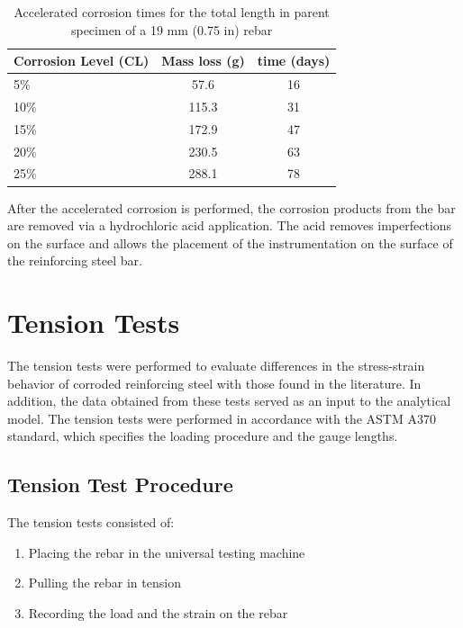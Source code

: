 \begin{table}[htbp]
	\caption{Accelerated corrosion times for the total length in parent specimen of a 19 mm (0.75 in) rebar}
	\label{tab:AcceleratedCorrosionTime}
	\centering	
		\begin{tabular}{l c c}
		Corrosion Level (CL) & Mass loss (g)   & time (days)     \\  \hline	
		5\%                  & 57.6            & 16    \\	
		10\%                 & 115.3            & 31     \\	
		15\%                 & 172.9            & 47   \\	
		20\%                 & 230.5            & 63     \\
		25\%                 & 288.1               & 78   \\
		\end{tabular}
\end{table}

After the accelerated corrosion is performed, the corrosion products from the bar are removed via a hydrochloric acid application. The acid removes imperfections on the surface and allows the placement of the instrumentation on the surface of the reinforcing steel bar.

\section{Tension Tests}

The tension tests were performed to evaluate differences in the stress-strain behavior of corroded reinforcing steel with those found in the literature. In addition, the data obtained from these tests served as an input to the analytical model. The tension tests were performed in accordance with the ASTM A370 standard, which specifies the loading procedure and the gauge lengths. 
\subsection{Tension Test Procedure}

The tension tests consisted of:
\begin{enumerate}
    \item Placing the rebar in the universal testing machine
    \item Pulling the rebar in tension 
    \item Recording the load and the strain on the rebar 
\end{enumerate}

